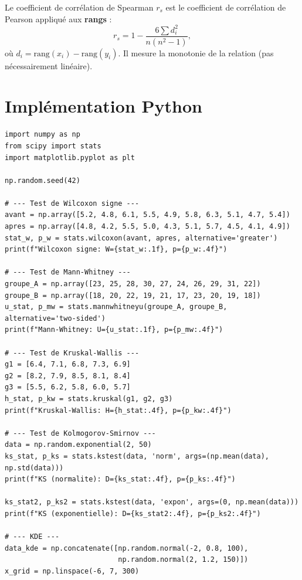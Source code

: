 \begin{definition}
Le coefficient de corr\'elation de Spearman $r_s$ est le coefficient de corr\'elation de Pearson appliqu\'e aux \textbf{rangs} :
\[
r_s = 1-\frac{6\sum d_i^2}{n(n^2-1)},
\]
o\`u $d_i=\mathrm{rang}(x_i)-\mathrm{rang}(y_i)$. Il mesure la monotonie de la relation (pas n\'ecessairement lin\'eaire).
\end{definition}

\section{Impl\'ementation Python}

\begin{python}
\begin{verbatim}
import numpy as np
from scipy import stats
import matplotlib.pyplot as plt

np.random.seed(42)

# --- Test de Wilcoxon signe ---
avant = np.array([5.2, 4.8, 6.1, 5.5, 4.9, 5.8, 6.3, 5.1, 4.7, 5.4])
apres = np.array([4.8, 4.2, 5.5, 5.0, 4.3, 5.1, 5.7, 4.5, 4.1, 4.9])
stat_w, p_w = stats.wilcoxon(avant, apres, alternative='greater')
print(f"Wilcoxon signe: W={stat_w:.1f}, p={p_w:.4f}")

# --- Test de Mann-Whitney ---
groupe_A = np.array([23, 25, 28, 30, 27, 24, 26, 29, 31, 22])
groupe_B = np.array([18, 20, 22, 19, 21, 17, 23, 20, 19, 18])
u_stat, p_mw = stats.mannwhitneyu(groupe_A, groupe_B, alternative='two-sided')
print(f"Mann-Whitney: U={u_stat:.1f}, p={p_mw:.4f}")

# --- Test de Kruskal-Wallis ---
g1 = [6.4, 7.1, 6.8, 7.3, 6.9]
g2 = [8.2, 7.9, 8.5, 8.1, 8.4]
g3 = [5.5, 6.2, 5.8, 6.0, 5.7]
h_stat, p_kw = stats.kruskal(g1, g2, g3)
print(f"Kruskal-Wallis: H={h_stat:.4f}, p={p_kw:.4f}")

# --- Test de Kolmogorov-Smirnov ---
data = np.random.exponential(2, 50)
ks_stat, p_ks = stats.kstest(data, 'norm', args=(np.mean(data), np.std(data)))
print(f"KS (normalite): D={ks_stat:.4f}, p={p_ks:.4f}")

ks_stat2, p_ks2 = stats.kstest(data, 'expon', args=(0, np.mean(data)))
print(f"KS (exponentielle): D={ks_stat2:.4f}, p={p_ks2:.4f}")

# --- KDE ---
data_kde = np.concatenate([np.random.normal(-2, 0.8, 100),
                           np.random.normal(2, 1.2, 150)])
x_grid = np.linspace(-6, 7, 300)


\end{verbatim}
\end{python}

